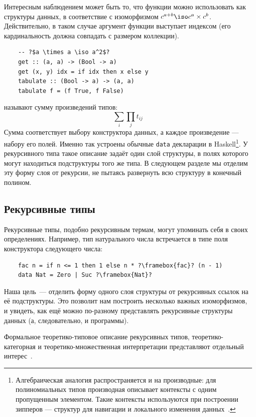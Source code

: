 Интересным наблюдением может быть то, что функции можно использовать как структуры данных, в соответствие с изоморфизмом $c^{a + b} \iso c^a\times c^b$.
Действительно, в таком случае аргумент функции выступает индексом (его кардинальность должна совпадать с размером коллекции).
\begin{verbatim}
    -- ?$a \times a \iso a^2$?
    get :: (a, a) -> (Bool -> a)
    get (x, y) idx = if idx then x else y
    tabulate :: (Bool -> a) -> (a, a)
    tabulate f = (f True, f False)
\end{verbatim}

 называют сумму произведений типов:
\[
    \sum_{i}\prod_{j} t_{ij}
\]
Сумма соответствует выбору конструктора данных, а каждое произведение --- набору его полей.
Именно так устроены обычные \texttt{data} декларации в Haskell\footnote{Алгебраическая аналогия распространяется и на производные: для полиномиальных типов производная описывает контексты с одним пропущенным элементом. Такие контексты используются при построении зипперов --- структур для навигации и локального изменения данных~\cite{huet1997zipper, mcbride2001derivative, abbott2003derivatives}.}.
У рекурсивного типа такое описание задаёт один слой структуры, в полях которого могут находиться подструктуры того же типа.
В следующем разделе мы отделим эту форму слоя от рекурсии, не пытаясь развернуть всю структуру в конечный полином.

\subsection{Рекурсивные типы} \label{subsec:recursive-types}

Рекурсивные типы, подобно рекурсивным термам, могут упоминать себя в своих определениях.
Например, тип натурального числа встречается в типе поля конструктора следующего числа:
\begin{verbatim}
    fac n = if n <= 1 then 1 else n * ?\framebox{fac}? (n - 1)
    data Nat = Zero | Suc ?\framebox{Nat}?
\end{verbatim}

Наша цель~--- отделить форму одного слоя структуры от рекурсивных ссылок на её подструктуры.
Это позволит нам построить несколько важных изоморфизмов, и увидеть, как ещё можно по-разному представлять рекурсивные структуры данных (а, следовательно, и программы).

Формальное теоретико-типовое описание рекурсивных типов, теоретико-категорная и теоретико-множественная интерпретации представляют отдельный интерес~\cite[часть 4]{pierce2002types}.

